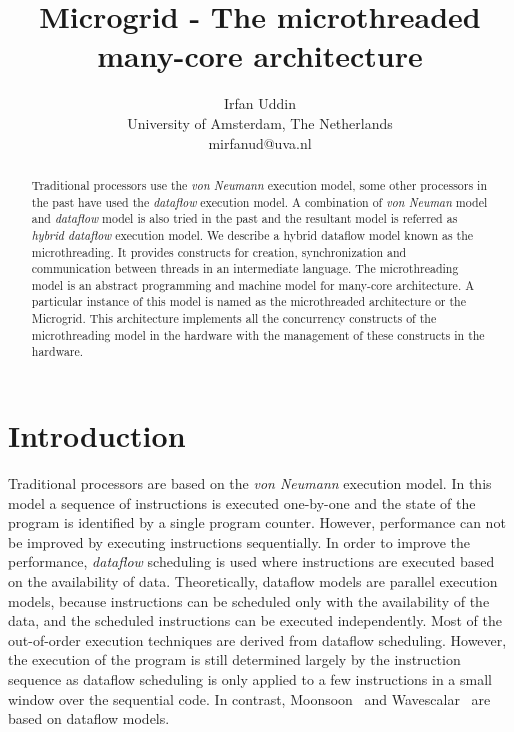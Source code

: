 \documentclass{article}
\begin{document}
\title{Microgrid - The microthreaded many-core architecture}

\author{Irfan Uddin\\
University of Amsterdam, The Netherlands\\
mirfanud@uva.nl}

\maketitle

\begin{abstract}

Traditional processors use the \emph{von Neumann} execution model, some other
processors in the past have used the \emph{dataflow} execution model. A
combination of \emph{von Neuman} model and \emph{dataflow} model is also tried
in the past and the resultant model is referred as \emph{hybrid dataflow}
execution model. We describe a hybrid dataflow model known as the
microthreading. It provides constructs for creation, synchronization and
communication between threads in an intermediate language. The microthreading
model is an abstract programming and machine model for many-core architecture.
A particular instance of this model is named as the microthreaded architecture
or the Microgrid. This architecture implements all the concurrency constructs
of the microthreading model in the hardware with the management of these
constructs in the hardware.

\end{abstract}

\setcounter{tocdepth}{1}
\tableofcontents

\newpage

\section{Introduction}
\label{sn:introduction}

Traditional processors are based on the \emph{von Neumann} execution model. In
this model a sequence of instructions is executed one-by-one and the state of
the program is identified by a single program counter. However, performance can
not be improved by executing instructions sequentially. In order to improve
the performance, \emph{dataflow} scheduling is used where instructions are
executed based on the availability of data. Theoretically, dataflow models are
parallel execution models, because instructions can be scheduled only with the
availability of the data, and the scheduled instructions can be executed
independently. Most of the out-of-order execution techniques are derived from
dataflow scheduling. However, the execution of the program is still determined
largely by the instruction sequence as dataflow scheduling is only applied to
a few instructions in a small window over the sequential code. In contrast,
Moonsoon~\cite{Papadopoulos:1998:MET:285930.285999} and
Wavescalar~\cite{Swanson:2007:WA:1233307.1233308} are based on dataflow
models.
\end{document}
